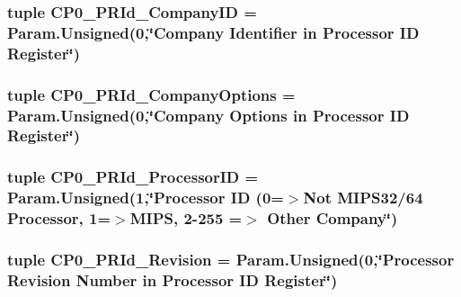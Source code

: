 \label{classMipsCPU_1_1BaseMipsCPU_a0a4089c6aacda5dd54c80fc8584cfdd7}
\hypertarget{classMipsCPU_1_1BaseMipsCPU_ad167f6c016fd37b2e5d1919f1ef8fa51}{
\subsubsection[{CP0\_\-PRId\_\-CompanyID}]{\setlength{\rightskip}{0pt plus 5cm}tuple {\bf CP0\_\-PRId\_\-CompanyID} = Param.Unsigned(0,\char`\"{}Company Identifier in Processor ID {\bf Register}\char`\"{})}}
\label{classMipsCPU_1_1BaseMipsCPU_ad167f6c016fd37b2e5d1919f1ef8fa51}
\hypertarget{classMipsCPU_1_1BaseMipsCPU_ac6b47ad1af64db771080945a47e0f96f}{
\subsubsection[{CP0\_\-PRId\_\-CompanyOptions}]{\setlength{\rightskip}{0pt plus 5cm}tuple {\bf CP0\_\-PRId\_\-CompanyOptions} = Param.Unsigned(0,\char`\"{}Company Options in Processor ID {\bf Register}\char`\"{})}}
\label{classMipsCPU_1_1BaseMipsCPU_ac6b47ad1af64db771080945a47e0f96f}
\hypertarget{classMipsCPU_1_1BaseMipsCPU_ab88e96bc42511f6884701a8b06c4fff7}{
\subsubsection[{CP0\_\-PRId\_\-ProcessorID}]{\setlength{\rightskip}{0pt plus 5cm}tuple {\bf CP0\_\-PRId\_\-ProcessorID} = Param.Unsigned(1,\char`\"{}Processor ID (0=$>$Not MIPS32/64 Processor, 1=$>$MIPS, 2-\/255 =$>$ Other Company\char`\"{})}}
\label{classMipsCPU_1_1BaseMipsCPU_ab88e96bc42511f6884701a8b06c4fff7}
\hypertarget{classMipsCPU_1_1BaseMipsCPU_abf8501ad012082959fc56c8b2fe097d8}{
\subsubsection[{CP0\_\-PRId\_\-Revision}]{\setlength{\rightskip}{0pt plus 5cm}tuple {\bf CP0\_\-PRId\_\-Revision} = Param.Unsigned(0,\char`\"{}Processor Revision Number in Processor ID {\bf Register}\char`\"{})}}
